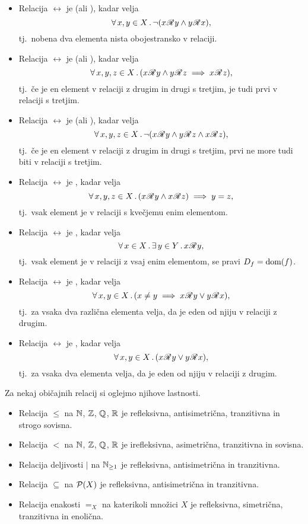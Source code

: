 \begin{definicija}
\begin{itemize}
				\item
					Relacija $\rel$ je  (ali ), kadar velja
					\[\xall{x, y}[X]{\lnot(x \rel y \land y \rel x)},\]
					tj.~nobena dva elementa nista obojestransko v relaciji.
				\item
					Relacija $\rel$ je  (ali ), kadar velja
					\[\all{x, y, z}[X]{x \rel y \land y \rel z \implies x \rel z},\]
					tj.~če je en element v relaciji z drugim in drugi s tretjim, je tudi prvi v relaciji s tretjim.
				\item
					Relacija $\rel$ je  (ali ), kadar velja
					\[\xall{x, y, z}[X]{\lnot(x \rel y \land y \rel z \land x \rel z)},\]
					tj.~če je en element v relaciji z drugim in drugi s tretjim, prvi ne more tudi biti v relaciji s tretjim.
				\item
					Relacija $\rel$ je , kadar velja
					\[\all{x, y, z}[X]{x \rel y \land x \rel z} \implies y = z,\]
					tj.~vsak element je v relaciji s kvečjemu enim elementom.
				\item
					Relacija $\rel$ je , kadar velja
					\[\xall{x}[X]{\xsome{y}[Y]{x \rel y}},\]
					tj.~vsak element je v relaciji z vsaj enim elementom, se pravi $D_{f} = \mathrm{dom}(f)$.
				\item
					Relacija $\rel$ je , kadar velja
					\[\all{x, y}[X]{x \neq y \implies x \rel y \lor y \rel x},\]
					tj.~za vsaka dva različna elementa velja, da je eden od njiju v relaciji z drugim.
				\item
					Relacija $\rel$ je , kadar velja
					\[\all{x, y}[X]{x \rel y \lor y \rel x},\]
					tj.~za vsaka dva elementa velja, da je eden od njiju v relaciji z drugim.
			\end{itemize}
		\end{definicija}
		
		\begin{zgled}
			Za nekaj običajnih relacij si oglejmo njihove lastnosti.
			\begin{itemize}
				\item
					Relacija $\leq$ na $\mathbb{N}$, $\mathbb{Z}$, $\mathbb{Q}$, $\mathbb{R}$ je refleksivna, antisimetrična, tranzitivna in strogo sovisna.
				\item
					Relacija $<$ na $\mathbb{N}$, $\mathbb{Z}$, $\mathbb{Q}$, $\mathbb{R}$ je irefleksivna, asimetrična, tranzitivna in sovisna.
				\item
					Relacija deljivosti $|$ na $\mathbb{N}_{\geq 1}$ je refleksivna, antisimetrična in tranzitivna.
				\item
					Relacija $\subseteq$ na $\mathcal{P}(X)$ je refleksivna, antisimetrična in tranzitivna.
				\item
					Relacija enakosti $=_X$ na katerikoli množici $X$ je refleksivna, simetrična, tranzitivna in enolična.
			\end{itemize}
		\end{zgled}
		
